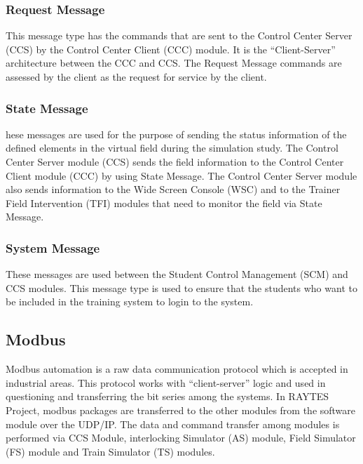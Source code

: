 \documentclass[conference]{IEEEtran}
\begin{document}
\subsubsection{Request Message}
This message type has the commands that are sent to the Control Center Server (CCS) by the Control Center Client (CCC) module. It is the “Client-Server” architecture between the CCC and CCS. The Request Message commands are assessed by the client as the request for service by the client.

\subsubsection{State Message}

hese messages are used for the purpose of sending the status information of the defined elements in the virtual field during the simulation study. The Control Center Server module (CCS) sends the field information to the Control Center Client module (CCC) by using State Message. The Control Center Server module also sends information to the Wide Screen Console (WSC) and to the Trainer Field Intervention (TFI) modules that need to monitor the field via State Message.

\subsubsection{System Message}
These messages are used between the Student Control Management (SCM) and CCS modules. 
This message type is used to ensure that the students who want to be included in the training system to login to the system.
\subsection{Modbus}
Modbus automation is a raw data communication protocol which is accepted in industrial areas. This protocol works with “client-server” logic and used in questioning and transferring the bit series among the systems. In RAYTES Project, modbus packages are transferred to the other modules from the software module over the UDP/IP. The data and command transfer among modules is performed via CCS Module, interlocking Simulator (AS) module, Field Simulator (FS) module and Train Simulator (TS) modules. 
\end{document}
